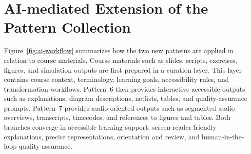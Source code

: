 \section{AI-mediated Extension of the Pattern Collection}

Figure~\ref{fig:ai-workflow} summarizes how the two new patterns are applied in relation to course materials. Course materials such as slides, scripts, exercises, figures, and simulation outputs are first prepared in a curation layer. This layer contains course context, terminology, learning goals, accessibility rules, and transformation workflows. Pattern~6 then provides interactive accessible outputs such as explanations, diagram descriptions, netlists, tables, and quality-assurance prompts. Pattern~7 provides audio-oriented outputs such as segmented audio overviews, transcripts, timecodes, and references to figures and tables. Both branches converge in accessible learning support: screen-reader-friendly explanations, precise representations, orientation and review, and human-in-the-loop quality assurance.

